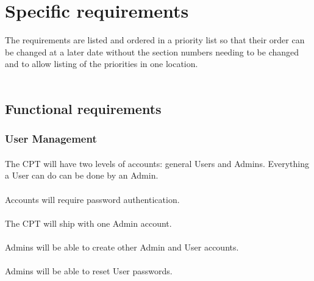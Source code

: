 \documentclass[12pt]{article}
\begin{document}
\section{Specific requirements}
The requirements are listed and ordered in a priority list so that their order can be changed at a later date without the section numbers needing to be changed and to allow listing of the priorities in one location.\\
\\

\begin{comment}
The first 2 are to be considered absolutely critical. The software cannot be considered useful if those features are absent.

What are the security implications of storing identifiable time sheet info for employees??
\end{comment}

\subsection{Functional requirements}

\subsubsection{User Management}\label{sec:Users}
\paragraph{} The CPT will have two levels of accounts: general Users and Admins. Everything a User can do can be done by an Admin.
\paragraph{} Accounts will require password authentication.
\paragraph{} The CPT will ship with one Admin account.
\paragraph{} Admins will be able to create other Admin and User accounts.
\paragraph{} Admins will be able to reset User passwords.
\end{document}
